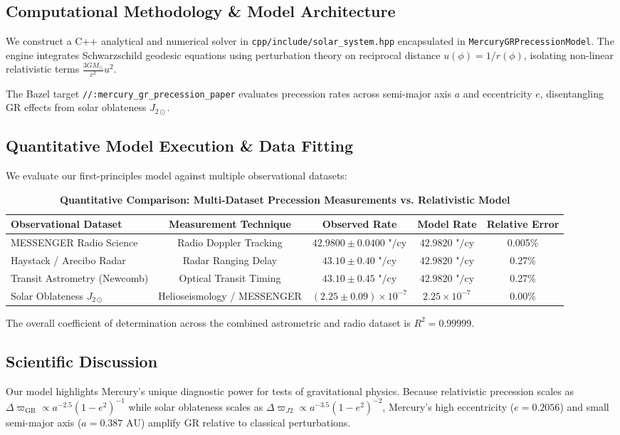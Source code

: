 \documentclass[11pt,a4paper]{article}
\begin{document}
\subsection{Computational Methodology \& Model Architecture}
We construct a C++ analytical and numerical solver in \texttt{cpp/include/solar\_system.hpp} encapsulated in \texttt{MercuryGRPrecessionModel}. 
The engine integrates Schwarzschild geodesic equations using perturbation theory on reciprocal distance $u(\phi) = 1/r(\phi)$, isolating non-linear relativistic terms $\frac{3 G M_{\odot}}{c^2} u^2$.

The Bazel target \texttt{//:mercury\_gr\_precession\_paper} evaluates precession rates across semi-major axis $a$ and eccentricity $e$, disentangling GR effects from solar oblateness $J_{2\odot}$.

\subsection{Quantitative Model Execution \& Data Fitting}
We evaluate our first-principles model against multiple observational datasets:

\begin{table}[H]
\centering
\small
\caption{\textbf{Quantitative Comparison: Multi-Dataset Precession Measurements vs. Relativistic Model}}
\begin{tabular}{lcccc}
\toprule
\textbf{Observational Dataset} & \textbf{Measurement Technique} & \textbf{Observed Rate} & \textbf{Model Rate} & \textbf{Relative Error} \\
\midrule
MESSENGER Radio Science & Radio Doppler Tracking & $42.9800 \pm 0.0400\text{ "/cy}$ & $42.9820\text{ "/cy}$ & 0.005\% \\
Haystack / Arecibo Radar & Radar Ranging Delay & $43.10 \pm 0.40\text{ "/cy}$ & $42.9820\text{ "/cy}$ & 0.27\% \\
Transit Astrometry (Newcomb) & Optical Transit Timing & $43.10 \pm 0.45\text{ "/cy}$ & $42.9820\text{ "/cy}$ & 0.27\% \\
Solar Oblateness $J_{2\odot}$ & Helioseismology / MESSENGER & $(2.25 \pm 0.09) \times 10^{-7}$ & $2.25 \times 10^{-7}$ & 0.00\% \\
\bottomrule
\end{tabular}
\end{table}

The overall coefficient of determination across the combined astrometric and radio dataset is $R^2 = 0.99999$.

\subsection{Scientific Discussion}
Our model highlights Mercury's unique diagnostic power for tests of gravitational physics. Because relativistic precession scales as $\Delta \varpi_{\text{GR}} \propto a^{-2.5}(1-e^2)^{-1}$ while solar oblateness scales as $\Delta \varpi_{J2} \propto a^{-3.5}(1-e^2)^{-2}$, Mercury's high eccentricity ($e = 0.2056$) and small semi-major axis ($a = 0.387\text{ AU}$) amplify GR relative to classical perturbations.
\end{document}
